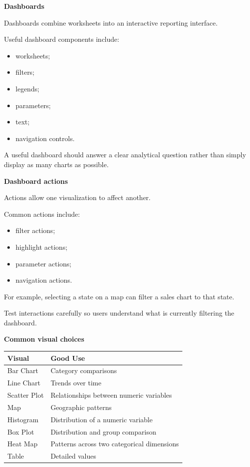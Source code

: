\documentclass[11pt,letterpaper]{article}
\begin{document}
\textbf{Dashboards}

Dashboards combine worksheets into an interactive reporting interface.

Useful dashboard components include:

\begin{itemize}[leftmargin=*]
    \item worksheets;
    \item filters;
    \item legends;
    \item parameters;
    \item text;
    \item navigation controls.
\end{itemize}

A useful dashboard should answer a clear analytical question rather than simply
display as many charts as possible.



\textbf{Dashboard actions}

Actions allow one visualization to affect another.

Common actions include:

\begin{itemize}[leftmargin=*]
    \item filter actions;
    \item highlight actions;
    \item parameter actions;
    \item navigation actions.
\end{itemize}

For example, selecting a state on a map can filter a sales chart to that state.

Test interactions carefully so users understand what is currently filtering
the dashboard.



\textbf{Common visual choices}

\begin{center}
\begin{tabularx}{\textwidth}{lX}
\toprule
Visual & Good Use \\
\midrule
Bar Chart & Category comparisons \\
Line Chart & Trends over time \\
Scatter Plot & Relationships between numeric variables \\
Map & Geographic patterns \\
Histogram & Distribution of a numeric variable \\
Box Plot & Distribution and group comparison \\
Heat Map & Patterns across two categorical dimensions \\
Table & Detailed values \\
\bottomrule
\end{tabularx}
\end{center}
\end{document}
